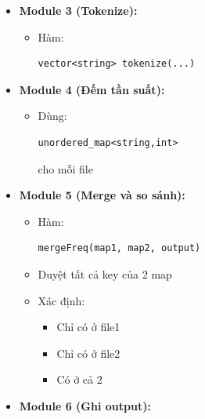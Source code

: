 \begin{itemize}
\begin{itemize}
\begin{itemize}
            \item Chuyển lowercase
            \item Ký tự không phải chữ/số $\rightarrow$ space
            \item Gom nhiều space thành 1
        \end{itemize}

        \item \textbf{Module 3 (Tokenize):}

        \begin{itemize}
            \item Hàm:
\begin{lstlisting}
vector<string> tokenize(...)
\end{lstlisting}
        \end{itemize}

        \item \textbf{Module 4 (Đếm tần suất):}

        \begin{itemize}
            \item Dùng:
\begin{lstlisting}
unordered_map<string,int>
\end{lstlisting}

            cho mỗi file
        \end{itemize}

        \item \textbf{Module 5 (Merge và so sánh):}

        \begin{itemize}
            \item Hàm:
\begin{lstlisting}
mergeFreq(map1, map2, output)
\end{lstlisting}

            \item Duyệt tất cả key của 2 map
            \item Xác định:
            \begin{itemize}
                \item Chỉ có ở file1
                \item Chỉ có ở file2
                \item Có ở cả 2
            \end{itemize}
        \end{itemize}

        \item \textbf{Module 6 (Ghi output):}


\end{itemize}
\end{itemize}
